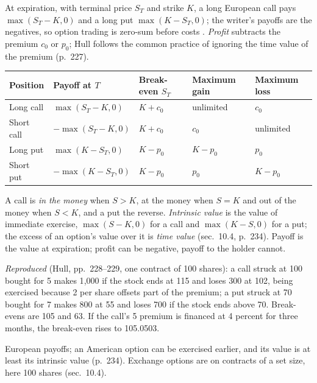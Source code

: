 \begin{qfmethod}\label{meth:option-payoff-profit}
 At expiration, with terminal price $S_T$ and strike $K$, a long European call pays $\max(S_T-K,0)$ and a long put $\max(K-S_T,0)$; the writer's payoffs are the negatives, so option trading is zero-sum before costs \citep[chap.~10, secs.~10.1--10.2, pp.~227--230, and Figure~10.5, p.~231]{s7-hulloptions}. \emph{Profit} subtracts the premium $c_0$ or $p_0$; Hull follows the common practice of ignoring the time value of the premium (p.~227).

\begin{center}\small
\begin{tabular}{@{}lllll@{}}
\toprule
Position & Payoff at $T$ & Break-even $S_T$ & Maximum gain & Maximum loss \\
\midrule
Long call & $\max(S_T-K,0)$ & $K+c_0$ & unlimited & $c_0$ \\
Short call & $-\max(S_T-K,0)$ & $K+c_0$ & $c_0$ & unlimited \\
Long put & $\max(K-S_T,0)$ & $K-p_0$ & $K-p_0$ & $p_0$ \\
Short put & $-\max(K-S_T,0)$ & $K-p_0$ & $p_0$ & $K-p_0$ \\
\bottomrule
\end{tabular}
\end{center}
A call is \emph{in the money} when $S>K$, at the money when $S=K$ and out of the money when $S<K$, and a put the reverse. \emph{Intrinsic value} is the value of immediate exercise, $\max(S-K,0)$ for a call and $\max(K-S,0)$ for a put; the excess of an option's value over it is \emph{time value} (sec.~10.4, p.~234). Payoff is the value at expiration; profit can be negative, payoff to the holder cannot.

 \emph{Reproduced} (Hull, pp.~228--229, one contract of 100 shares): a call struck at 100 bought for 5 makes 1{,}000 if the stock ends at 115 and loses 300 at 102, being exercised because 2 per share offsets part of the premium; a put struck at 70 bought for 7 makes 800 at 55 and loses 700 if the stock ends above 70. Break-evens are 105 and 63. If the call's 5 premium is financed at 4 percent for three months, the break-even rises to 105.0503.

 European payoffs; an American option can be exercised earlier, and its value is at least its intrinsic value (p.~234). Exchange options are on contracts of a set size, here 100 shares (sec.~10.4).


\end{qfmethod}
